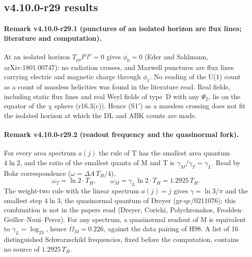 \subsection*{v4.10.0-r29 results}
\label{subsec:v4100-r29-results}

\paragraph{Remark v4.10.0-r29.1 (punctures of an isolated horizon are flux lines; literature and computation).}
At an isolated horizon \(T_{\mu\nu}l^\mu l^\nu=0\) gives \(\phi_0=0\) (Eder and Sahlmann, arXiv:1801.00747): no radiation crosses, and Maxwell punctures
are flux lines carrying electric and magnetic charge through \(\phi_1\).  No reading of the U(1) count as a count of massless helicities was found in
the literature read.  Real fields, including static flux lines and real Weyl fields of type~D with any \(\Psi_2\), lie on the equator of the \(\chi\)
sphere (r16.3(c)).  Hence (S1\('\)) as a massless crossing does not fit the isolated horizon at which the DL and ABK counts are made.

\paragraph{Remark v4.10.0-r29.2 (readout frequency and the quasinormal fork).}
For every area spectrum \(a(j)\) the rule of T has the smallest area quantum \(4\ln2\), and the ratio of the smallest quanta of M and T is
\(\gamma_M/\gamma_T=\gamma_L\).  Read by Bohr correspondence (\(\omega=\Delta A\,T_H/4\)),
\[
\omega_T=\ln2\cdot T_H,\qquad \omega_M=\gamma_L\ln2\cdot T_H=1.2925\,T_H .
\]
The weight-two rule with the linear spectrum \(a(j)=j\) gives \(\gamma=\ln3/\pi\) and the smallest step \(4\ln3\), the quasinormal quantum of Dreyer
(gr-qc/0211076); this combination is not in the papers read (Dreyer, Corichi, Polychronakos, Frodden--Geiller--Noui--Perez).  For any spectrum, a
quasinormal readout of M is equivalent to \(\gamma_L=\log_23\), hence \(\Omega_M=0.226\), against the data pairing of H98.  A list of 16 distinguished
Schwarzschild frequencies, fixed before the computation, contains no source of \(1.2925\,T_H\).


